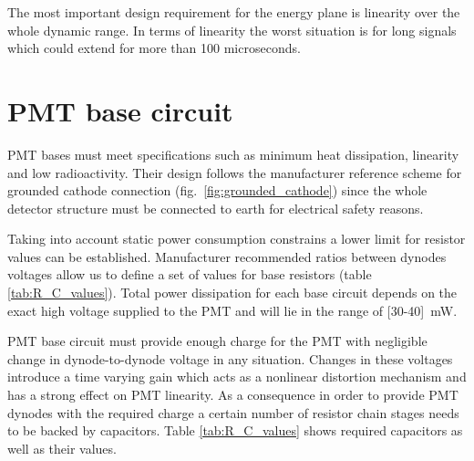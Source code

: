 \documentclass[a4paper, 10pt, oneside, twocolumn, 3p]{elsarticle}
\begin{document}
The most important design requirement for the energy plane is linearity over the whole dynamic range. In terms of linearity the worst situation is for long signals which could extend for more than 100 microseconds. 



\section {PMT base circuit}

\par PMT bases must meet specifications such as minimum heat dissipation, linearity and low radioactivity. Their design follows the manufacturer reference scheme for grounded cathode connection (fig.~\ref{fig:grounded_cathode}) since the whole detector structure must be connected to earth for electrical safety reasons.


\par Taking into account static power consumption constrains a lower limit for resistor values can be established. Manufacturer recommended ratios between dynodes voltages allow us to define a set of values for base resistors (table \ref{tab:R_C_values}). Total power dissipation for each base circuit depends on the exact high voltage supplied to the PMT and will lie in the range of [30-40]~mW. 

\par PMT base circuit must provide enough charge for the PMT with negligible change in dynode-to-dynode voltage in any situation. Changes in these voltages introduce a time varying gain which acts as a nonlinear distortion mechanism and has a strong effect on PMT linearity. As a consequence in order to provide PMT dynodes with the required charge a certain number of resistor chain stages needs to be backed by capacitors. Table \ref{tab:R_C_values} shows required capacitors as well as their values. 
\end{document}

